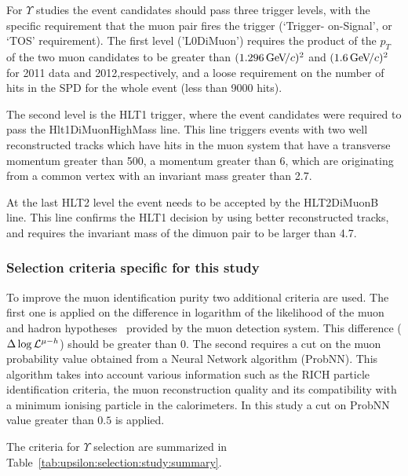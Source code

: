 For $\Upsilon$ studies the event candidates should pass three trigger levels,
with the specific requirement that the muon pair fires the trigger (`Trigger-
on-Signal', or `TOS' requirement). The first level ('L0DiMuon') requires the
product of the $p_T$ of the two muon candidates to be greater than
$(1.296{\mathrm{\,Ge\kern -0.1em V\!/}c})^2$ and $(1.6{\mathrm{\,Ge\kern -0.1em V\!/}c})^2$ for 2011 data and 2012,respectively, and
a loose requirement on the number of hits in the SPD for the whole event (less
than 9000 hits).

The second level is the HLT1 trigger, where the event candidates were required to
pass the Hlt1DiMuonHighMass line.
This line triggers events with  two well reconstructed tracks  which have hits
in the muon system  that have a transverse momentum greater than 500\mevc,  
a momentum greater than 6\gevc, which are originating from a common vertex with
an invariant mass greater than 2.7\gevcc.

At the last HLT2 level the event needs to be accepted by the HLT2DiMuonB line.
This line confirms the HLT1 decision by using better reconstructed tracks, 
and requires the invariant mass of the dimuon pair to be larger than 4.7\gevcc.

\subsubsection{Selection criteria specific for this study}
\label{sec:upsilon:selection:study}

To improve the muon identification purity two additional criteria are used. The
first one is applied on the difference in logarithm of the likelihood of the
muon and hadron hypotheses~\cite{Powell} provided by the muon detection system.
This difference ($\Delta\log\mathcal{L}^{\mu-h}$) should be greater than 0. The
second requires a cut on the muon probability value obtained from a Neural
Network algorithm (ProbNN). This algorithm takes into account various
information such as the RICH particle identification criteria, the muon
reconstruction quality and its compatibility with a minimum ionising particle in the
calorimeters. In this study a cut on  ProbNN value
greater than $0.5$ is applied. 

The criteria for  $\Upsilon$ selection are summarized in
Table~\ref{tab:upsilon:selection:study:summary}.



